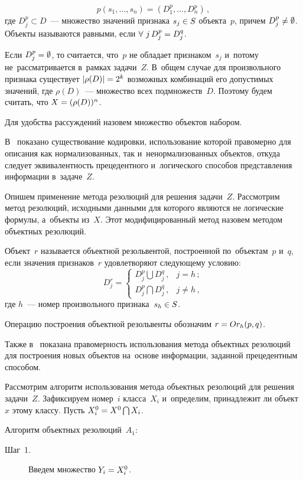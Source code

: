 \begin{multicols}{2}
\pagebreak

\noindent
$$
p\left(s_{1},\ldots,s_{n}\right)=\left(D^{p}_{1},\ldots,D^{p}_{n}\right)\,, 
$$
где $D^{p}_{j}\subset D $~--- множество значений признака $s_{j}\hm\in S $ объекта~$p$, 
причем $ D^{p}_{j}\hm\neq\emptyset $.
Объекты называются равными, если $ \forall\ j\, D^{p}_{j}\hm = D^{q}_{j} $.

Если $ D^{p}_{j}\hm=\emptyset$, то считается, что~$p$ не обладает признаком~$s_{j}$ 
и~потому не~рассматривается в~рамках задачи~$Z$.
В~общем случае для произвольного признака существует $ |\rho(D)|\hm=2^{k} $ 
возможных комбинаций его допустимых значений, где $\rho(D)$~--- множество 
всех подмножеств~$D$.
Поэтому будем считать, что $X\hm=(\rho(D))^{n} $.

Для удобства рассуждений назовем множество объектов набором.

В~\cite{patrec} показано существование кодировки, использование которой 
правомерно для описания как нормализованных, так и~ненормализованных объектов,
откуда следует эквивалентность прецедентного 
и~логического способов представления информации в~задаче~$Z$.

Опишем применение метода резолюций для решения задачи~$Z$.
Рассмотрим метод резолюций, исходными данными для которого являются 
не логические формулы, а~объекты из~$X$.
Этот модифицированный метод назовем методом объектных резолюций.

Объект~$r$ называется объектной резольвентой, построенной по~объектам~$p$ 
и~$q$, если значения признаков~$r$ удовлетворяют следующему условию:
$$
 D_{j}^{r}= \begin{cases}
D_{j}^{p} \bigcup D_{j}^{q}\,, & j=h\,; \\
D_{j}^{p} \bigcap D_{j}^{q}\,, & j \neq h\,,
\end{cases}
$$
где $h$~--- номер произвольного признака~$ s_{h}\hm\in S $.

Операцию построения объектной резольвенты обозначим $r\hm=Or_{h}(p,q) $.

Также в~\cite{patrec} показана правомерность использования метода объектных 
резолюций для построения новых объектов на~основе информации, заданной 
прецедентным способом.

Рассмотрим алгоритм использования метода объектных резолюций для решения задачи~$Z$.
Зафиксируем номер~$i$ класса~$X_{i}$ и~определим, принадлежит ли объект~$x$ 
этому классу.
Пусть $ X_{i}^{0}\hm=X^{0} \bigcap X_{i} $.

Алгоритм объектных резолюций~$A_{1} $:
\begin{description}
\item[Шаг~1.] Введем множество $Y_{i}\hm=X_{i}^{0} $.


\end{description}
\end{multicols}
